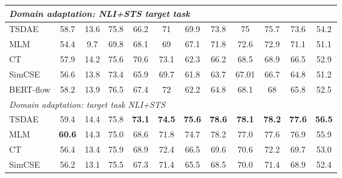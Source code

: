 \documentclass[11pt]{article}
\begin{document}
\begin{table*}[t]
{\begin{tabular}{|l|c|c|ccc|ccccc|c|}
\hline
\multicolumn{12}{|l|}{ \textit{Domain adaptation: NLI+STS  target task} }  \\
\hline
TSDAE  & 58.7 & 13.6 & 75.8 & 66.2 & 71 & {69.9} & {73.8} & {75} & {75.7} & {73.6} & {54.2} \\
MLM & 54.4 & 9.7 & 69.8 & 68.1 & 69 & 67.1 & 71.8 & 72.6 & 72.9 & 71.1 & 51.1 \\
CT & 57.9 & 14.2 & 75.6 & 70.6 & 73.1 & 62.3 & 66.2 & 68.5 & 68.9 & 66.5 & 52.9 \\
SimCSE & 56.6 & 13.8 & 73.4 & 65.9 & 69.7 & 61.8 & 63.7 & 67.01 & 66.7 & 64.8 & 51.2 \\
BERT-flow & 58.2 & 13.9 & 76.5 & 67.4 & 72 & 62.2 & 64.8 & 68.1 & 68 & 65.8 & 52.5 \\

\hline
\multicolumn{12}{|l|}{ \textit{Domain adaptation: target task  NLI+STS} } \\
\hline
TSDAE & {59.4} & {14.4} & 75.8 & \textbf{73.1} & \textbf{74.5} & \textbf{75.6} & \textbf{78.6} & \textbf{78.1} & \textbf{78.2} & \textbf{77.6} & \textbf{56.5} \\
MLM & \textbf{60.6} & 14.3 & 75.0 & 68.6 & 71.8 & 74.7 & 78.2 & 77.0 & 77.6 & 76.9 & 55.9 \\
CT & 56.4 & 13.4 & 75.9 & 68.9 & 72.4 & 66.5 & 69.6 & 70.6 & 72.2 & 69.7 & 53.0 \\
SimCSE & 56.2 & 13.1 & 75.5 & 67.3 & 71.4 & 65.5 & 68.5 & 70.0 & 71.4 & 68.9 & 52.4 \\



\end{tabular}}
\end{table*}
\end{document}
